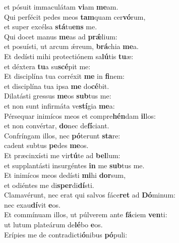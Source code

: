\oddverse et pósuit immaculátam \textbf{vi}am \textbf{me}am.\\
\evenverse Qui perfécit pedes meos \textbf{tam}quam cer\textbf{vó}rum,~\*\\
\evenverse et super excélsa \textbf{stá}tu\textbf{ens} me.\\
\oddverse Qui docet manus \textbf{me}as ad \textbf{prǽ}lium:~\*\\
\oddverse et posuísti, ut arcum ǽreum, \textbf{brá}chia \textbf{me}a.\\
\evenverse Et dedísti mihi protectiónem sa\textbf{lú}tis \textbf{tu}æ:~\*\\
\evenverse et déxtera \textbf{tu}a su\textbf{scé}pit me:\\
\oddverse Et disciplína tua corréxit \textbf{me} in \textbf{fi}nem:~\*\\
\oddverse et disciplína tua ipsa \textbf{me} do\textbf{cé}bit.\\
\evenverse Dilatásti gressus \textbf{me}os \textbf{sub}tus me:~\*\\
\evenverse et non sunt infirmáta ve\textbf{stí}gia \textbf{me}a:\\
\oddverse Pérsequar inimícos meos et compre\textbf{hén}dam \textbf{il}los:~\*\\
\oddverse et non convértar, \textbf{do}nec de\textbf{fí}ciant.\\
\evenverse Confríngam illos, nec \textbf{pó}terunt \textbf{sta}re:~\*\\
\evenverse cadent subtus \textbf{pe}des \textbf{me}os.\\
\oddverse Et præcinxísti me vir\textbf{tú}te ad \textbf{bel}lum:~\*\\
\oddverse et supplantásti insurgéntes \textbf{in} me \textbf{sub}tus me.\\
\evenverse Et inimícos meos dedísti \textbf{mi}hi \textbf{dor}sum,~\*\\
\evenverse et odiéntes me di\textbf{sper}di\textbf{dí}sti.\\
\oddverse Clamavérunt, nec erat qui salvos fáce\textbf{ret} ad \textbf{Dó}minum:~\*\\
\oddverse nec exau\textbf{dí}vit \textbf{e}os.\\
\evenverse Et commínuam illos, ut púlverem ante \textbf{fá}ciem \textbf{ven}ti:~\*\\
\evenverse ut lutum plateárum de\textbf{lé}bo \textbf{e}os.\\
\oddverse Erípies me de contradicti\textbf{ó}nibus \textbf{pó}puli:~\*\\
